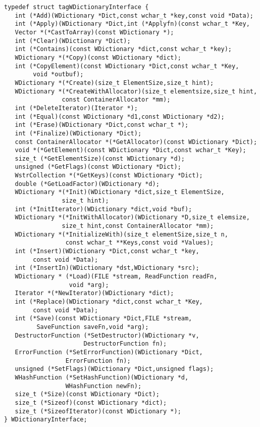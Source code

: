 \begin{verbatim}
typedef struct tagWDictionaryInterface {
   int (*Add)(WDictionary *Dict,const wchar_t *key,const void *Data);
   int (*Apply)(WDictionary *Dict,int (*Applyfn)(const wchar_t *Key,
   Vector *(*CastToArray)(const WDictionary *);
   int (*Clear)(WDictionary *Dict);
   int (*Contains)(const WDictionary *dict,const wchar_t *key);
   WDictionary *(*Copy)(const WDictionary *dict);
   int (*CopyElement)(const WDictionary *Dict,const wchar_t *Key,
        void *outbuf);
   WDictionary *(*Create)(size_t ElementSize,size_t hint);
   WDictionary *(*CreateWithAllocator)(size_t elementsize,size_t hint,
                const ContainerAllocator *mm);
   int (*DeleteIterator)(Iterator *);
   int (*Equal)(const WDictionary *d1,const WDictionary *d2);
   int (*Erase)(WDictionary *Dict,const wchar_t *);
   int (*Finalize)(WDictionary *Dict);
   const ContainerAllocator *(*GetAllocator)(const WDictionary *Dict);
   void *(*GetElement)(const WDictionary *Dict,const wchar_t *Key);
   size_t (*GetElementSize)(const WDictionary *d);
   unsigned (*GetFlags)(const WDictionary *Dict);
   WstrCollection *(*GetKeys)(const WDictionary *Dict);
   double (*GetLoadFactor)(WDictionary *d);
   WDictionary *(*Init)(WDictionary *dict,size_t ElementSize,
                size_t hint);
   int (*InitIterator)(WDictionary *dict,void *buf);
   WDictionary *(*InitWithAllocator)(WDictionary *D,size_t elemsize,
                size_t hint,const ContainerAllocator *mm);
   WDictionary *(*InitializeWith)(size_t elementSize,size_t n,
                 const wchar_t **Keys,const void *Values);
   int (*Insert)(WDictionary *Dict,const wchar_t *key,
        const void *Data);
   int (*InsertIn)(WDictionary *dst,WDictionary *src);
   WDictionary * (*Load)(FILE *stream, ReadFunction readFn,
                  void *arg);
   Iterator *(*NewIterator)(WDictionary *dict);
   int (*Replace)(WDictionary *dict,const wchar_t *Key,
        const void *Data);
   int (*Save)(const WDictionary *Dict,FILE *stream,
         SaveFunction saveFn,void *arg);
   DestructorFunction (*SetDestructor)(WDictionary *v,
                      DestructorFunction fn);
   ErrorFunction (*SetErrorFunction)(WDictionary *Dict,
                 ErrorFunction fn);
   unsigned (*SetFlags)(WDictionary *Dict,unsigned flags);
   WHashFunction (*SetHashFunction)(WDictionary *d,
                 WHashFunction newFn);
   size_t (*Size)(const WDictionary *Dict);
   size_t (*Sizeof)(const WDictionary *dict);
   size_t (*SizeofIterator)(const WDictionary *);
} WDictionaryInterface;
\end{verbatim}
